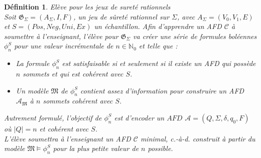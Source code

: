\documentclass[12pt,a4paper,oneside,titlepage]{report}
\newtheorem{defi}{D\'efinition}[section]
\begin{document}
\begin{defi}{Elève pour les jeux de sureté rationnels\\}
\label{learner}
Soit $\mathfrak{G}_\Sigma=(A_\Sigma, I, F)$, un jeu de sûreté rationnel sur $\Sigma$, avec $A_\Sigma=(V_0,V_1,E)$ et $S=(Pos,Neg,Uni,Ex)$ un échantillon. Afin d'apprendre un AFD $\mathcal{C}$ à soumettre à l'enseignant, l'élève pour $\mathfrak{G}_\Sigma$ va créer une série de formules boléennes $\phi^S_n$ pour une valeur incrémentale de $n\in\mathbb{N}_0$ et telle que :
\begin{itemize}
\item La formule $\phi^S_n$ est satisfaisable si et seulement si il existe un AFD qui possède $n$ sommets et qui est cohérent avec $S$.
\item Un modèle $\mathfrak{M}$ de $\phi^S_n$ contient assez d'information pour construire un AFD $\mathcal{A}_\mathfrak{M}$ à $n$ sommets cohérent avec $S$.
\end{itemize}
\noindent Autrement formulé, l'objectif de $\phi^S_n$ est d'encoder un $AFD$ $\mathcal{A}=(Q,\Sigma,\delta,q_0,F)$ où $|Q|=n$ et cohérent avec $S$.\\
L'élève soumettra à l'enseignant un AFD $\mathcal{C}$ minimal, c.-à-d. construit à partir du modèle $\mathfrak{M}\models \phi_n^S$ pour la plus petite valeur de $n$ possible.
\end{defi}
\end{document}
